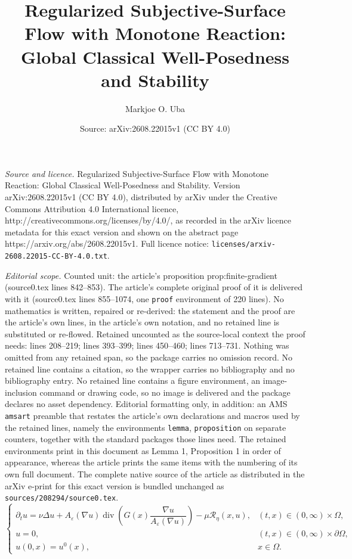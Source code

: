 \documentclass[10pt,a4paper]{amsart}
\title{Regularized Subjective-Surface Flow with Monotone Reaction: Global Classical Well-Posedness and Stability}
\author{Markjoe O. Uba}
\date{Source: arXiv:2608.22015v1 (CC BY 4.0)}
\newcommand{\cT}{\mathcal{R}}
\newcommand{\eps}{\varepsilon}
\newcommand{\nupar}{\nu}
\begin{document}
\maketitle

\noindent\emph{Source and licence.} Regularized Subjective-Surface Flow with Monotone Reaction: Global Classical Well-Posedness and Stability. Version arXiv:2608.22015v1 (CC BY 4.0), distributed by arXiv under the Creative Commons Attribution 4.0 International licence, http://creativecommons.org/licenses/by/4.0/, as recorded in the arXiv licence metadata for this exact version and shown on the abstract page https://arxiv.org/abs/2608.22015v1. Full licence notice: \texttt{licenses/arxiv-2608.22015-CC-BY-4.0.txt}.\par\smallskip

\noindent\textit{Editorial scope.} Counted unit: the article's proposition prop:finite-gradient (source0.tex lines 842--853). The article's complete original proof of it is delivered with it (source0.tex lines 855--1074, one \texttt{proof} environment of 220 lines). No mathematics is written, repaired or re-derived: the statement and the proof are the article's own lines, in the article's own notation, and no retained line is substituted or re-flowed.  Retained uncounted as the source-local context the proof needs: lines 208--219; lines 393--399; lines 450--460; lines 713--731.  Nothing was omitted from any retained span, so the package carries no omission record.  No retained line contains a citation, so the wrapper carries no bibliography and no bibliography entry.  No retained line contains a figure environment, an image-inclusion command or drawing code, so no image is delivered and the package declares no asset dependency.  Editorial formatting only, in addition: an AMS \texttt{amsart} preamble that restates the article's own declarations and macros used by the retained lines, namely the environments \texttt{lemma}, \texttt{proposition} on separate counters, together with the standard packages those lines need.  The retained environments print in this document as Lemma 1, Proposition 1 in order of appearance, whereas the article prints the same items with the numbering of its own full document.  The complete native source of the article as distributed in the arXiv e-print for this exact version is bundled unchanged as \texttt{sources/208294/source0.tex}.
\begin{equation}\label{eq:main-pde}
\boxed{
\begin{cases}
\partial_t u
=\nupar\Delta u+
A_\eps(\nabla u)\operatorname{div}\!\left(G(x)\dfrac{\nabla u}{A_\eps(\nabla u)}\right)
-\mu\cT_\eta(x,u),
& (t,x)\in(0,\infty)\times\Omega,\\[2mm]
u=0,& (t,x)\in(0,\infty)\times\partial\Omega,\\[1mm]
u(0,x)=u^0(x),& x\in\Omega.
\end{cases}}
\end{equation}
\end{document}
